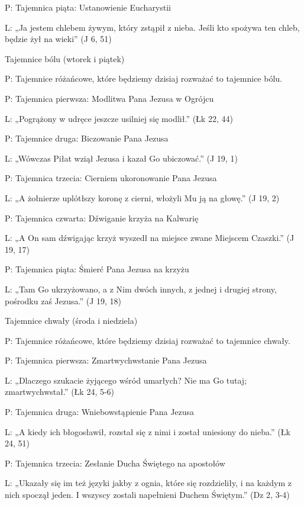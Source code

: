 ﻿\documentclass[9pt,twoside]{extarticle}
\begin{document}
{\hnr P:} Tajemnica piąta: Ustanowienie Eucharystii


{\hnr L:} „Ja jestem chlebem żywym, który zstąpił z nieba. Jeśli kto spożywa ten chleb, będzie żył na wieki” (J 6, 51)


{\hnr Tajemnice bólu (wtorek i piątek)}


{\hnr P:} Tajemnice różańcowe, które będziemy dzisiaj rozważać to tajemnice bólu.


{\hnr P:} Tajemnica pierwsza: Modlitwa Pana Jezusa w Ogrójcu


{\hnr L:} „Pogrążony w udręce jeszcze usilniej się modlił.” (Łk 22, 44)


{\hnr P:} Tajemnice druga: Biczowanie Pana Jezusa


{\hnr L:} „Wówczas Piłat wziął Jezusa i kazał Go ubiczować.” (J 19, 1)


{\hnr P:} Tajemnica trzecia: Cierniem ukoronowanie Pana Jezusa


{\hnr L:} „A żołnierze uplótłszy koronę z cierni, włożyli Mu ją na głowę.” (J 19, 2)


{\hnr P:} Tajemnica czwarta: Dźwiganie krzyża na Kalwarię


{\hnr L:} „A On sam dźwigając krzyż wyszedł na miejsce zwane Miejscem Czaszki.” (J 19, 17)






{\hnr P:} Tajemnica piąta: Śmierć Pana Jezusa na krzyżu


{\hnr L:} „Tam Go ukrzyżowano, a z Nim dwóch innych, z jednej i drugiej strony, pośrodku zaś Jezusa.” (J 19, 18)




{\hnr Tajemnice chwały (środa i niedziela)}


{\hnr P:} Tajemnice różańcowe, które będziemy dzisiaj rozważać to tajemnice chwały.


{\hnr P:} Tajemnica pierwsza: Zmartwychwstanie Pana Jezusa


{\hnr L:} „Dlaczego szukacie żyjącego wśród umarłych? Nie ma Go tutaj; zmartwychwstał.” (Łk 24, 5-6)


{\hnr P:} Tajemnica druga: Wniebowstąpienie Pana Jezusa


{\hnr L:} „A kiedy ich błogosławił, rozstał się z nimi i został uniesiony do nieba.” (Łk 24, 51)


{\hnr P:} Tajemnica trzecia: Zesłanie Ducha Świętego na apostołów


{\hnr L:} „Ukazały się im też języki jakby z ognia, które się rozdzieliły, i na każdym z nich spoczął jeden. I wszyscy zostali napełnieni Duchem Świętym.” (Dz 2, 3-4)
\end{document}
